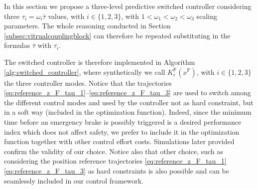 \documentclass[letterpaper, 10 pt, conference]{ieeeconf}
\theoremstyle{definition}
\theoremstyle{nopoint}
\begin{document}
In this section we propose a three-level predictive switched controller considering three $\tau_i=\omega_i \bar{\tau}$ values, with $i\in \{1,2,3\}$, with $1<\omega_1 < \omega_2< \omega_3$ scaling parameters. The whole reasoning conducted in Section \ref{subsec:vitrualcouplingblock} can therefore be repeated substituting in the formulas $\bar{\tau}$ with $\tau_i$. 

The switched controller is therefore implemented in Algorithm \ref{alg:switched_controller}, where synthetically we call $K^{\mathrm{F}}_i(x^{\mathrm{F}})$, with $i\in \{1,2,3\}$ the three controller modes. Notice that the trajectories \eqref{eq:reference_z_F_tau_1}–\eqref{eq:reference_z_F_tau_3} are used to switch among the different control modes and used by the controller not as hard constraint, but in a soft way (included in the optimization function). Indeed, since the minimum time before an emergency brake is possibly triggered is a desired performance index which does not affect safety, we prefer to include it in the optimization function together with other control effort costs. Simulations later provided confirm the validity of our choice. Notice also that other choice, such as considering the position reference trajectories \eqref{eq:reference_z_F_tau_1} \textemdash{} \eqref{eq:reference_z_F_tau_3} as hard constraints is also possible and can be seamlessly included in our control framework.
\end{document}
